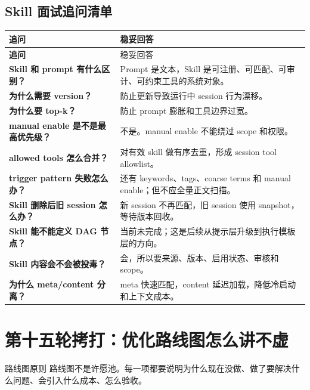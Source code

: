 \subsection{Skill 面试追问清单}
\begin{longtable}{>{\bfseries}p{}p{}}
\toprule
追问 & 稳妥回答 \\
\midrule
\endfirsthead
\toprule
追问 & 稳妥回答 \\
\midrule
\endhead
Skill 和 prompt 有什么区别？ & Prompt 是文本，Skill 是可注册、可匹配、可审计、可约束工具的系统对象。 \\
为什么需要 version？ & 防止更新导致运行中 session 行为漂移。 \\
为什么要 top-k？ & 防止 prompt 膨胀和工具边界过宽。 \\
manual enable 是不是最高优先级？ & 不是。manual enable 不能绕过 scope 和权限。 \\
allowed tools 怎么合并？ & 对有效 skill 做有序去重，形成 session tool allowlist。 \\
trigger pattern 失败怎么办？ & 还有 keywords、tags、coarse terms 和 manual enable；但不应全量正文扫描。 \\
Skill 删除后旧 session 怎么办？ & 新 session 不再匹配，旧 session 使用 snapshot，等待版本回收。 \\
Skill 能不能定义 DAG 节点？ & 当前未完成；这是后续从提示层升级到执行模板层的方向。 \\
Skill 内容会不会被投毒？ & 会，所以要来源、版本、启用状态、审核和 scope。 \\
为什么 meta/content 分离？ & meta 快速匹配，content 延迟加载，降低冷启动和上下文成本。 \\
\bottomrule
\end{longtable}

\section{第十五轮拷打：优化路线图怎么讲不虚}

\begin{summaryBox}{路线图原则}
路线图不是许愿池。每一项都要说明为什么现在没做、做了要解决什么问题、会引入什么成本、怎么验收。
\end{summaryBox}

